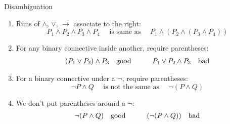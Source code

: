 \documentclass[xetex,aspectratio=169,14pt,hyperref={pdfpagelabels=true,pdflang={en-GB}}]{beamer}
\begin{document}
\begin{frame}
  {Disambiguation}
  \begin{enumerate}
  \item Runs of $\land$, $\lor$, $\to$ associate to the right:
    \begin{displaymath}
      P_1 \land P_2 \land P_3 \land P_4 \quad \textrm{ is same as }\quad P_1 \land (P_2 \land (P_3 \land P_4))
    \end{displaymath}
  \item For any binary connective inside another, require parentheses:
    \begin{displaymath}
      \begin{array}{ll@{\hspace{3em}}ll}
        (P_1 \lor P_2) \land P_3&\textrm{good} &
        P_1 \lor P_2 \land P_3&\textrm{bad}
      \end{array}
    \end{displaymath}
  \item For a binary connective under a $\lnot$, require parentheses:
    \begin{displaymath}
        \lnot P \land Q \quad \textrm{ is not the same as } \quad \lnot (P \land Q)
    \end{displaymath}
  \item We don't put parentheses around a $\lnot$:
    \begin{displaymath}
      \begin{array}{ll@{\hspace{3em}}ll}
        \lnot (P \land Q) &\textrm{good} &
        (\lnot (P \land Q)) &\textrm{bad}
      \end{array}
    \end{displaymath}
  \end{enumerate}

\end{frame}

\def\hiddenuntil<#1>#2{{\temporal<#1>{\color{black!0}}{\color{black}}{\color{black}} #2}}
\end{document}
